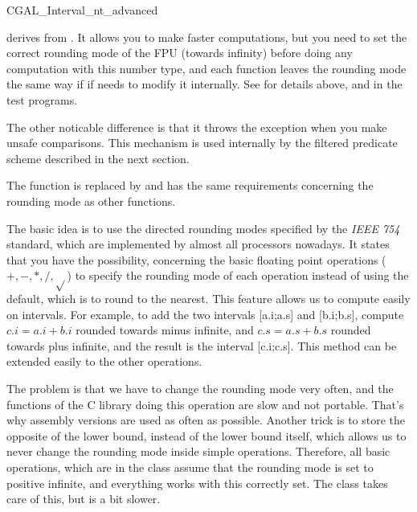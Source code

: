 \begin{ccAdvanced}

\begin{ccClass} {CGAL_Interval_nt_advanced}
\label{interval-adv}

 derives from .
It allows you to make faster computations, but you need to set the correct
rounding mode of the FPU (towards infinity) before doing any computation with
this number type, and each function leaves the rounding mode the same way if
if needs to modify it internally.
See for details above, and in the test programs.

The other noticable difference is that it throws the exception
 when you make unsafe
comparisons.  This mechanism is used internally by the filtered predicate
scheme described in the next section.

The function  is replaced by
 and has the same requirements concerning
the rounding mode as other functions.


\ccImplementation

The basic idea is to use the directed rounding modes specified by the 
{\it IEEE 754} standard, which are implemented by almost all processors 
nowadays.
It states that you have the possibility, concerning the basic floating point
operations ($+,-,*,/,\sqrt{}$) to specify the rounding mode of each operation
instead of using the default, which is to round to the nearest.
This feature allows us to compute easily on intervals.  For example, to add
the two intervals [a.i;a.s] and [b.i;b.s], compute $c.i=a.i+b.i$ rounded
towards minus infinite, and $c.s=a.s+b.s$ rounded towards plus infinite, and
the result is the interval [c.i;c.s].  This method can be extended easily to
the other operations.

The problem is that we have to change the rounding mode very often, and the
functions of the C library doing this operation are slow and not portable.
That's why assembly versions are used as often as possible.
Another trick is to store the opposite of the lower bound, instead of the
lower bound itself, which allows us to never change the rounding mode inside
simple operations.  Therefore, all basic operations, which are in the class 
 assume that the rounding mode is set to 
positive infinite, and everything works with this correctly set.  
The class  takes care of this, but is a bit slower.


\end{ccClass}
\end{ccAdvanced}

